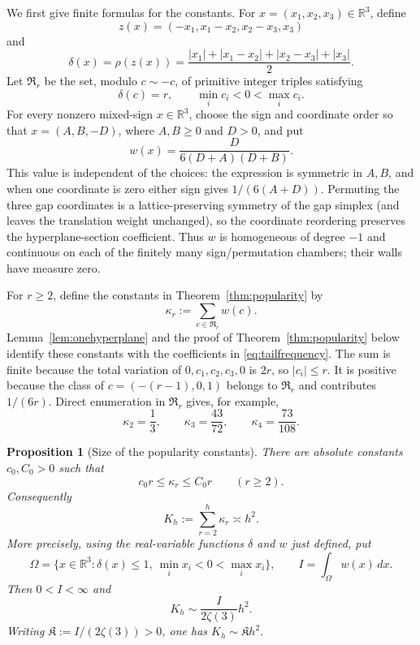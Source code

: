 \documentclass[11pt,reqno]{amsart}
\newtheorem{proposition}[theorem]{Proposition}
\theoremstyle{definition}
\theoremstyle{remark}
\begin{document}
We first give finite formulas for the constants.  For
$x=(x_1,x_2,x_3)\in\mathbb R^3$, define
\[
 z(x)=(-x_1,x_1-x_2,x_2-x_3,x_3)
\]
and
\begin{equation}\label{eq:gapdegree}
 \delta(x)=\rho(z(x))=
 \frac{|x_1|+|x_1-x_2|+|x_2-x_3|+|x_3|}{2}.
\end{equation}
Let $\mathfrak R_r$ be the set, modulo $c\sim-c$, of primitive integer
triples satisfying
\[
 \delta(c)=r,\qquad \min_i c_i<0<\max_i c_i.
\]
For every nonzero mixed-sign $x\in\mathbb R^3$, choose the sign and coordinate
order so that $x=(A,B,-D)$, where $A,B\geq0$ and $D>0$, and put
\begin{equation}\label{eq:relationweight}
 w(x)=\frac{D}{6(D+A)(D+B)}.
\end{equation}
This value is independent of the choices: the expression is symmetric in
$A,B$, and when one coordinate is zero either sign gives
$1/(6(A+D))$.  Permuting the three gap coordinates is a lattice-preserving
symmetry of the gap simplex (and leaves the translation weight unchanged),
so the coordinate reordering preserves the hyperplane-section coefficient.
Thus $w$ is homogeneous of degree $-1$ and continuous on each of the finitely
many sign/permutation chambers; their walls have measure zero.

For $r\geq2$, define the constants in Theorem~\ref{thm:popularity} by
\begin{equation}\label{eq:kappaformula}
 \boxed{\ \kappa_r:=\sum_{c\in\mathfrak R_r}w(c).\ }
\end{equation}
Lemma~\ref{lem:onehyperplane} and the proof of
Theorem~\ref{thm:popularity} below identify these constants with the
coefficients in \eqref{eq:tailfrequency}.
The sum is finite because the total variation of
$0,c_1,c_2,c_3,0$ is $2r$, so $|c_i|\leq r$.  It is positive because the
class of $c=(-(r-1),0,1)$ belongs to $\mathfrak R_r$ and contributes
$1/(6r)$.  Direct enumeration in $\mathfrak R_r$ gives, for example,
\[
 \kappa_2=\frac13,\qquad
 \kappa_3=\frac{43}{72},\qquad
 \kappa_4=\frac{73}{108}.
\]

\begin{proposition}[Size of the popularity constants]\label{prop:kappasize}
There are absolute constants $c_0,C_0>0$ such that
\[
 c_0r\leq\kappa_r\leq C_0r\qquad(r\geq2).
\]
Consequently
\[
 K_h:=\sum_{r=2}^h\kappa_r\asymp h^2.
\]
More precisely, using the real-variable functions $\delta$ and $w$ just
defined, put
\[
 \Omega=\{x\in\mathbb R^3:\delta(x)\leq1,
 \ \min_i x_i<0<\max_i x_i\},
 \qquad I=\int_\Omega w(x)\,dx.
\]
Then $0<I<\infty$ and
\begin{equation}\label{eq:Khasymptotic}
 \boxed{\ K_h\sim\frac{I}{2\zeta(3)}h^2.\ }
\end{equation}
Writing $\mathfrak K:=I/(2\zeta(3))>0$, one has
$K_h\sim\mathfrak K h^2$.
\end{proposition}
\end{document}
